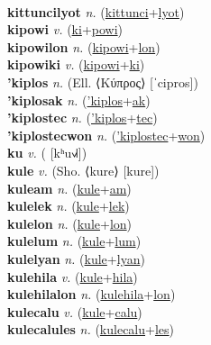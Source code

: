 \label{kittuncilum} \\
\textbf{kittuncilyot} \textit{n.} (\hyperref[kittunci]{kittunci}+\hyperref[lyot]{lyot})
 \label{kittuncilyot} \\
\textbf{kipowi} \textit{v.} (\hyperref[ki]{ki}+\hyperref[powi]{powi})
 \label{kipowi} \\
\textbf{kipowilon} \textit{n.} (\hyperref[kipowi]{kipowi}+\hyperref[lon]{lon})
 \label{kipowilon} \\
\textbf{kipowiki} \textit{v.} (\hyperref[kipowi]{kipowi}+\hyperref[ki]{ki})
 \label{kipowiki} \\
\textbf{'kiplos} \textit{n.} (Ell. ⟨Κύπρος⟩ [ˈcipros])
 \label{'kiplos} \\
\textbf{'kiplosak} \textit{n.} (\hyperref['kiplos]{'kiplos}+\hyperref[ak]{ak})
 \label{'kiplosak} \\
\textbf{'kiplostec} \textit{n.} (\hyperref['kiplos]{'kiplos}+\hyperref[tec]{tec})
 \label{'kiplostec} \\
\textbf{'kiplostecwon} \textit{n.} (\hyperref['kiplostec]{'kiplostec}+\hyperref[won]{won})
 \label{'kiplostecwon} \\
\textbf{ku} \textit{v.} ( [kʰu˧˩˧])
 \label{ku} \\
\textbf{kule} \textit{v.} (Sho. ⟨kure⟩ [kure])
 \label{kule} \\
\textbf{kuleam} \textit{n.} (\hyperref[kule]{kule}+\hyperref[am]{am})
 \label{kuleam} \\
\textbf{kulelek} \textit{n.} (\hyperref[kule]{kule}+\hyperref[lek]{lek})
 \label{kulelek} \\
\textbf{kulelon} \textit{n.} (\hyperref[kule]{kule}+\hyperref[lon]{lon})
 \label{kulelon} \\
\textbf{kulelum} \textit{n.} (\hyperref[kule]{kule}+\hyperref[lum]{lum})
 \label{kulelum} \\
\textbf{kulelyan} \textit{n.} (\hyperref[kule]{kule}+\hyperref[lyan]{lyan})
 \label{kulelyan} \\
\textbf{kulehila} \textit{v.} (\hyperref[kule]{kule}+\hyperref[hila]{hila})
 \label{kulehila} \\
\textbf{kulehilalon} \textit{n.} (\hyperref[kulehila]{kulehila}+\hyperref[lon]{lon})
 \label{kulehilalon} \\
\textbf{kulecalu} \textit{v.} (\hyperref[kule]{kule}+\hyperref[calu]{calu})
 \label{kulecalu} \\
\textbf{kulecalules} \textit{n.} (\hyperref[kulecalu]{kulecalu}+\hyperref[les]{les})
 \label{kulecalules} \\
